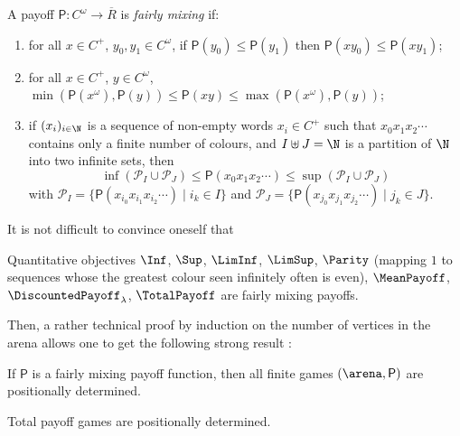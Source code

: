 \begin{definition}\label{4-def:fairly-mixing}
  A payoff $\mathsf{P}\colon C^\omega\to \overline R$ is \emph{fairly
    mixing} if:
  \begin{enumerate}
  \item for all $x\in C^+$, $y_0,y_1\in C^\omega$, if
    $\mathsf{P}(y_0)\leq \mathsf{P}(y_1)$ then
    $\mathsf{P}(xy_0)\leq \mathsf{P}(xy_1)$;
  \item for all $x\in C^+$, $y\in C^\omega$,
    $\min(\mathsf{P}(x^\omega),\mathsf{P}(y)) \leq \mathsf{P}(xy)\leq
    \max(\mathsf{P}(x^\omega),\mathsf{P}(y))$;
  \item if $(x_i)_{i\in \N}$ is a sequence of non-empty words
    $x_i\in C^+$ such that $x_0x_1x_2\cdots$ contains only a finite
    number of colours, and $I\uplus J=\N$ is a partition of $\N$ into two
    infinite sets, then
    \[\inf(\mathcal{P}_I\cup \mathcal{P}_J) \leq
      \mathsf{P}(x_0x_1x_2\cdots) \leq \sup(\mathcal{P}_I\cup
      \mathcal{P}_J)\] with
    $\mathcal P_I=\{\mathsf{P}(x_{i_0}x_{i_1}x_{i_2}\cdots)\mid i_k\in
    I\}$ and
    $\mathcal{P}_J=\{\mathsf{P}(x_{j_0}x_{j_1}x_{j_2}\cdots)\mid
    j_k\in J\}$.
  \end{enumerate}
\end{definition}

It is not difficult to convince oneself that
\begin{proposition}\label{4-prop:objectives-fairly}
  Quantitative objectives $\Inf$, $\Sup$, $\LimInf$, $\LimSup$,
  $\Parity$ (mapping $1$ to sequences whose the greatest colour seen
  infinitely often is even), $\MeanPayoff$,
  $\DiscountedPayoff_\lambda$, $\TotalPayoff$ are fairly mixing
  payoffs.
\end{proposition}

Then, a rather technical proof by induction on the number of vertices
in the arena allows one to get the following strong result \cite{Gimbert&Zielonka:2004}:

\begin{theorem}\label{4-thm:fairly-mixing}
  If $\mathsf P$ is a fairly mixing payoff function, then all finite
  games $(\arena,\mathsf P)$ are positionally determined.
\end{theorem}

\begin{corollary}\label{4-cor:TP-determinacy}
  Total payoff games are positionally determined.
\end{corollary}

